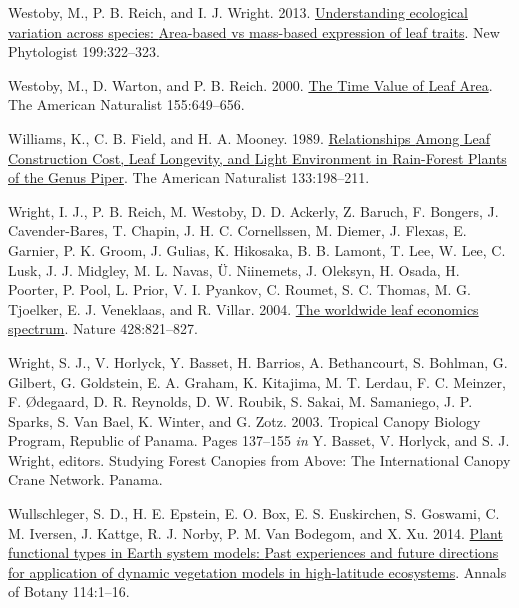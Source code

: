 \documentclass[
  12pt,
  letterpaper,
  DIV=11,
  numbers=noendperiod]{scrartcl}
\newlength{\cslhangindent}
\newlength{\cslentryspacingunit} %
\newenvironment{CSLReferences}[2] %
 {%
  \setlength{\parindent}{0pt}
  \ifodd #1
  \let\oldpar\par
  \def\par{\hangindent=\cslhangindent\oldpar}
  \fi
  \setlength{\parskip}{#2\cslentryspacingunit}
 }%
 {}
\begin{document}
\begin{CSLReferences}{1}{0}
\leavevmode{}%
Westoby, M., P. B. Reich, and I. J. Wright. 2013.
\href{https://doi.org/10.1111/nph.12345}{Understanding ecological
variation across species: {Area-based} vs mass-based expression of leaf
traits}. New Phytologist 199:322--323.

\leavevmode{}%
Westoby, M., D. Warton, and P. B. Reich. 2000.
\href{https://doi.org/10.1086/303346}{The {Time Value} of {Leaf Area}}.
The American Naturalist 155:649--656.

\leavevmode{}%
Williams, K., C. B. Field, and H. A. Mooney. 1989.
\href{https://doi.org/10.1086/284910}{Relationships {Among Leaf
Construction Cost}, {Leaf Longevity}, and {Light Environment} in
{Rain-Forest Plants} of the {Genus Piper}}. The American Naturalist
133:198--211.

\leavevmode{}%
Wright, I. J., P. B. Reich, M. Westoby, D. D. Ackerly, Z. Baruch, F.
Bongers, J. Cavender-Bares, T. Chapin, J. H. C. Cornellssen, M. Diemer,
J. Flexas, E. Garnier, P. K. Groom, J. Gulias, K. Hikosaka, B. B.
Lamont, T. Lee, W. Lee, C. Lusk, J. J. Midgley, M. L. Navas, Ü.
Niinemets, J. Oleksyn, H. Osada, H. Poorter, P. Pool, L. Prior, V. I.
Pyankov, C. Roumet, S. C. Thomas, M. G. Tjoelker, E. J. Veneklaas, and
R. Villar. 2004. \href{https://doi.org/10.1038/nature02403}{The
worldwide leaf economics spectrum}. Nature 428:821--827.

\leavevmode{}%
Wright, S. J., V. Horlyck, Y. Basset, H. Barrios, A. Bethancourt, S.
Bohlman, G. Gilbert, G. Goldstein, E. A. Graham, K. Kitajima, M. T.
Lerdau, F. C. Meinzer, F. Ødegaard, D. R. Reynolds, D. W. Roubik, S.
Sakai, M. Samaniego, J. P. Sparks, S. Van Bael, K. Winter, and G. Zotz.
2003. Tropical {Canopy Biology Program}, {Republic} of {Panama}. Pages
137--155 \emph{in} Y. Basset, V. Horlyck, and S. J. Wright, editors.
Studying {Forest Canopies} from {Above}: {The International Canopy Crane
Network}. {Panama}.

\leavevmode{}%
Wullschleger, S. D., H. E. Epstein, E. O. Box, E. S. Euskirchen, S.
Goswami, C. M. Iversen, J. Kattge, R. J. Norby, P. M. Van Bodegom, and
X. Xu. 2014. \href{https://doi.org/10.1093/aob/mcu077}{Plant functional
types in {Earth} system models: {Past} experiences and future directions
for application of dynamic vegetation models in high-latitude
ecosystems}. Annals of Botany 114:1--16.


\end{CSLReferences}
\end{document}

